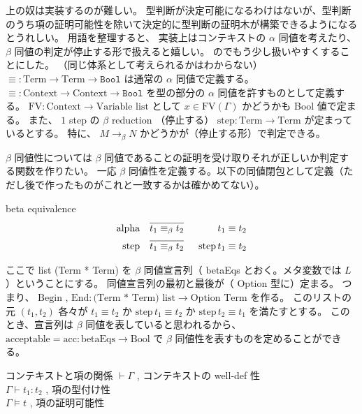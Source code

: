 上の奴は実装するのが難しい。
型判断が決定可能になるわけはないが、型判断のうち項の証明可能性を除いて決定的に型判断の証明木が構築できるようになるとうれしい。
用語を整理すると、
実装上はコンテキストの \(\alpha\) 同値を考えたり、\(\beta\) 同値の判定が停止する形で扱えると嬉しい。
のでもう少し扱いやすくすることにした。
（同じ体系として考えられるかはわからない）
\(\equiv: \text{Term} \to \text{Term} \to \texttt{Bool}\)
は通常の \(\alpha\) 同値で定義する。
\(\equiv : \text{Context} \to \text{Context} \to \texttt{Bool}\)
を型の部分の \(\alpha\) 同値を許すものとして定義する。
\(\text{FV} : \text{Context} \to \text{Variable list}\)
として \(x \in \text{FV}(\Gamma)\) かどうかも Bool 値で定まる。
また、 \(1\) step の \(\beta\) reduction （停止する）
\(\text{step} : \text{Term} \to \text{Term}\)
が定まっているとする。
特に、 \(M \rightarrow_{\beta} N\) かどうかが（停止する形）で判定できる。

\(\beta\) 同値性については \(\beta\) 同値であることの証明を受け取りそれが正しいか判定する関数を作りたい。
一応 \(\beta\) 同値性を定義する。以下の同値閉包として定義（ただし後で作ったものがこれと一致するかは確かめてない）。
\begin{itembox}[l]{beta equivalence}
\begin{align*}
  \text{alpha} &&
  \infer[]{t_1 \equiv_{\beta} t_2}{} && t_1 \equiv t_2 \\
  \text{step} &&
  \infer[]{t_1 \equiv_{\beta} t_2}{} && \text{step} \, t_1 \equiv t_2 \\
\end{align*}
\end{itembox}

ここで list (Term * Term) を \(\beta\) 同値宣言列（ betaEqs とおく。メタ変数では \(L\) ）ということにする。
同値宣言列の最初と最後が（ Option 型に）定まる。
つまり、 \(\text{Begin , End} : \text{(Term * Term) list} \to \text{Option Term}\) を作る。
このリストの元 \((t_1 , t_2)\) 各々が \(t_1 \equiv t_2\) か \(\text{step} \, t_1 \equiv t_2\) か \(\text{step} \, t_2 \equiv t_1\) を満たすとする。
このとき、宣言列は \(\beta\) 同値を表していると思われるから、\(\text{acceptable} = \text{acc} : \text{betaEqs} \to \text{Bool}\) で \(\beta\) 同値性を表すものを定めることができる。

\begin{itembox}[l]{コンテキストと項の関係}
  \(\vdash \Gamma\) , コンテキストの well-def 性 \\
  \(\Gamma \vdash t_1 : t_2\) , 項の型付け性 \\
  \(\Gamma \vDash t\) , 項の証明可能性
\end{itembox}

